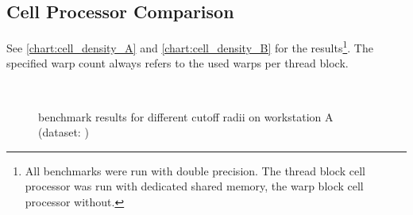 \subsection{Cell Processor Comparison}
\label{subsec:dataset_info}
See \autoref{chart:cell_density_A} and \autoref{chart:cell_density_B} for the results\footnote{All benchmarks were run with double precision. The thread block cell processor was run with dedicated shared memory, the warp block cell processor without.}. The specified warp count always refers to the used warps per thread block.

\begin{figure}
\centering
{}
\\
\caption{benchmark results for different cutoff radii on workstation A (dataset: )}
\label{chart:cell_density_A}
\end{figure}
